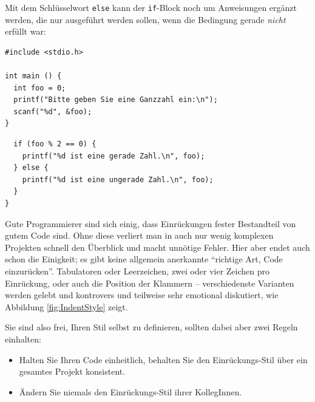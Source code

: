 Mit dem Schlüsselwort \texttt{else} kann der \texttt{if}-Block noch um Anweisungen ergänzt werden, die nur ausgeführt werden sollen, wenn die Bedingung gerade \emph{nicht} erfüllt war:

\begin{codebox}
\begin{verbatim}
#include <stdio.h>

int main () {
  int foo = 0;
  printf("Bitte geben Sie eine Ganzzahl ein:\n");
  scanf("%d", &foo);
}
\end{verbatim}
\end{codebox}
%
\begin{codebox}[]
\begin{verbatim}
  if (foo % 2 == 0) {
    printf("%d ist eine gerade Zahl.\n", foo);
  } else {
    printf("%d ist eine ungerade Zahl.\n", foo);
  }
}
\end{verbatim}
\end{codebox}

\begin{hintbox}
Gute Programmierer sind sich einig, dass Einrückungen fester Bestandteil von gutem Code sind. Ohne diese verliert man in auch nur wenig komplexen Projekten schnell den Überblick und macht unnötige Fehler. Hier aber endet auch schon die Einigkeit; es gibt keine allgemein anerkannte \enquote{richtige Art, Code einzurücken}. Tabulatoren oder Leerzeichen, zwei oder vier Zeichen pro Einrückung, oder auch die Position der Klammern -- verschiedenste Varianten werden gelebt und kontrovers und teilweise sehr emotional diskutiert, wie Abbildung \ref{fig:IndentStyle} zeigt.

Sie sind also frei, Ihren Stil selbst zu definieren, sollten dabei aber zwei Regeln einhalten:
\begin{itemize}
\item Halten Sie Ihren Code einheitlich, \ie behalten Sie den Einrückungs-Stil über ein gesamtes Projekt konsistent.
\item Ändern Sie niemals den Einrückungs-Stil ihrer KollegInnen.
\end{itemize}
\end{hintbox}

